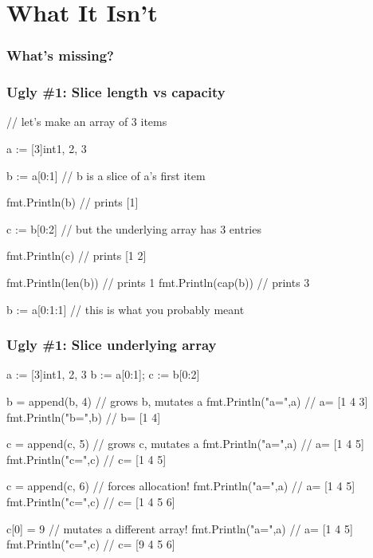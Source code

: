 \documentclass[compress,t,11pt]{beamer}
\begin{document}
\section{What It Isn't}
\begin{frame}
    \frametitle{What's missing?}
    \vspace{\baselineskip}
    \vspace{\baselineskip}
    \vspace{\baselineskip}
\end{frame}

\begin{frame}[fragile]
    \frametitle{Ugly \#1: Slice length vs capacity}
\begin{golang}
// let's make an array of 3 items

a := [3]int{1, 2, 3}

b := a[0:1]          // b is a slice of a's first item

fmt.Println(b)       // prints [1]

c := b[0:2]          // but the underlying array has 3 entries

fmt.Println(c)       // prints [1 2]

fmt.Println(len(b))  // prints 1
fmt.Println(cap(b))  // prints 3

b := a[0:1:1]        // this is what you probably meant
\end{golang}
\end{frame}
\begin{frame}[fragile]
    \frametitle{Ugly \#1: Slice underlying array}
\begin{golang}
a := [3]int{1, 2, 3}
b := a[0:1]; c := b[0:2]

b = append(b, 4)      // grows b, mutates a
fmt.Println("a=",a)   // a= [1 4 3]
fmt.Println("b=",b)   // b= [1 4]

c = append(c, 5)      // grows c, mutates a
fmt.Println("a=",a)   // a= [1 4 5]
fmt.Println("c=",c)   // c= [1 4 5]

c = append(c, 6)      // forces allocation!
fmt.Println("a=",a)   // a= [1 4 5]
fmt.Println("c=",c)   // c= [1 4 5 6]

c[0] = 9              // mutates a different array!
fmt.Println("a=",a)   // a= [1 4 5]
fmt.Println("c=",c)   // c= [9 4 5 6]
\end{golang}
\end{frame}
\end{document}
